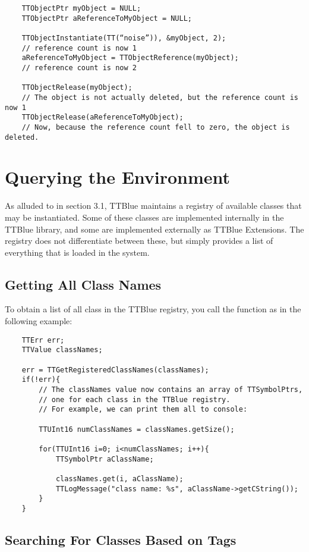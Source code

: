 \begin{lstlisting}
	TTObjectPtr myObject = NULL;
	TTObjectPtr aReferenceToMyObject = NULL;

	TTObjectInstantiate(TT(“noise”)), &myObject, 2);
	// reference count is now 1
	aReferenceToMyObject = TTObjectReference(myObject);
	// reference count is now 2

	TTObjectRelease(myObject);
	// The object is not actually deleted, but the reference count is now 1
	TTObjectRelease(aReferenceToMyObject);
	// Now, because the reference count fell to zero, the object is deleted.
\end{lstlisting}



\section{Querying the Environment}

As alluded to in section 3.1, TTBlue maintains a registry of available classes that may be instantiated.  Some of these classes are implemented internally in the TTBlue library, and some are implemented externally as TTBlue Extensions.  The registry does not differentiate between these, but simply provides a list of everything that is loaded in the system.


\subsection{Getting All Class Names}

To obtain a list of all class in the TTBlue registry, you call the  function as in the following example:

\begin{lstlisting}
	TTErr err;
	TTValue classNames;

	err = TTGetRegisteredClassNames(classNames);
	if(!err){
		// The classNames value now contains an array of TTSymbolPtrs, 
		// one for each class in the TTBlue registry.
		// For example, we can print them all to console:

		TTUInt16 numClassNames = classNames.getSize();

		for(TTUInt16 i=0; i<numClassNames; i++){
			TTSymbolPtr aClassName;

			classNames.get(i, aClassName);
			TTLogMessage("class name: %s", aClassName->getCString());
		}
	}
\end{lstlisting}

\subsection{Searching For Classes Based on Tags}

